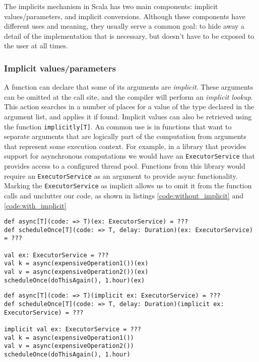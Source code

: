 The implicits mechanism in Scala has two main components: implicit values/parameters, and implicit conversions. Although these components have different uses and meaning, they usually serve a common goal: to hide away a detail of the implementation that is necessary, but doesn't have to be exposed to the user at all times.

\subsubsection{Implicit values/parameters}

A function can declare that some of its arguments are {\it implicit}. These arguments can be omitted at the call site, and the compiler will perform an {\it implicit lookup}. This action searches in a number of places for a value of the type declared in the argument list, and applies it if found. Implicit values can also be retrieved using the function \texttt{implicitly[T]}. An common use is in functions that want to separate arguments that are logically part of the computation from arguments that represent some execution context. For example, in a library that provides support for asynchronous computations we would have an \texttt{ExecutorService} that provides access to a configured thread pool. Functions from this library would require an \texttt{ExecutorService} as an argument to provide async functionality. Marking the \texttt{ExecutorService} as implicit allows us to omit it from the function calls and unclutter our code, as shown in listings \ref{code:without_implicit} and \ref{code:with_implicit}

\begin{lstlisting}[caption=Code without implicits, label=code:without_implicit]
def async[T](code: => T)(ex: ExecutorService) = ???
def scheduleOnce[T](code: => T, delay: Duration)(ex: ExecutorService) = ???

val ex: ExecutorService = ???
val k = async(expensiveOperation1())(ex)
val v = async(expensiveOperation2())(ex)
scheduleOnce(doThisAgain(), 1.hour)(ex)
\end{lstlisting}

\begin{lstlisting}[caption=Code with implicits, label=code:with_implicit, float]
def async[T](code: => T)(implicit ex: ExecutorService) = ???
def scheduleOnce[T](code: => T, delay: Duration)(implicit ex: ExecutorService) = ???

implicit val ex: ExecutorService = ???
val k = async(expensiveOperation1())
val v = async(expensiveOperation2())
scheduleOnce(doThisAgain(), 1.hour)
\end{lstlisting}


